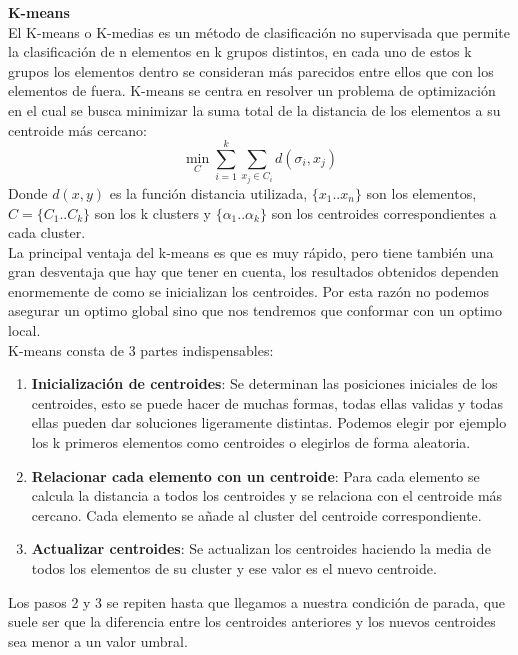 \documentclass[12pt,a4paper]{article}
\begin{document}
		{\textbf{K-means}}\\
		El K-means o K-medias es un método de clasificación no supervisada que permite la clasificación de n elementos en k grupos distintos, en cada uno de estos k grupos los elementos dentro se consideran más parecidos entre ellos que con los elementos de fuera. K-means se centra en resolver un problema de optimización en el cual se busca minimizar la suma total de la distancia de los elementos a su centroide más cercano:
		\[\min_{C} \sum_{i=1}^{k}\sum_{x_{j}\in C_{i}} d(\sigma_i , x_{j})\]
		Donde $d(x,y)$ es la función distancia utilizada,  $\{x_1..x_n\}$ son los elementos, $C=\{C_1..C_k\}$ son los k clusters y $\{\alpha_1..\alpha_k\}$  son los centroides correspondientes a cada cluster.\\
			La principal ventaja del k-means es que es muy rápido, pero tiene también una gran desventaja que hay que tener en cuenta, los resultados obtenidos dependen enormemente de como se inicializan los centroides. Por esta razón no podemos asegurar un optimo global sino que nos tendremos que conformar con un optimo local.\\
			K-means consta de 3 partes indispensables:\\
			\begin{enumerate}
			\item \textbf{Inicialización de centroides}: Se determinan las posiciones iniciales de los centroides, esto se puede hacer de muchas formas, todas ellas validas y todas ellas pueden dar soluciones ligeramente distintas. Podemos elegir por ejemplo los k primeros elementos como centroides o elegirlos de forma aleatoria.\\
			\item \textbf{Relacionar cada elemento con un centroide}: Para cada elemento se calcula la distancia a todos  los centroides y se relaciona con el centroide más cercano. Cada elemento se añade al cluster del centroide correspondiente.\\
			\item \textbf{Actualizar centroides}: Se actualizan los centroides haciendo la media de todos los elementos de su cluster y ese valor es el nuevo centroide.\\
			\end{enumerate}
			Los pasos 2 y 3 se repiten hasta que llegamos a nuestra condición de parada, que suele ser que la diferencia entre los centroides anteriores y los nuevos centroides sea menor a un valor umbral.\\
			
\end{document}
